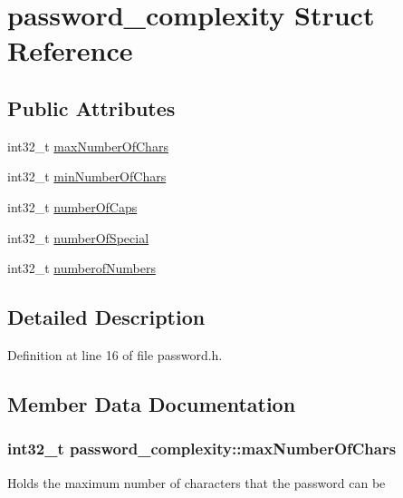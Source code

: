 \hypertarget{structpassword__complexity}{}\section{password\+\_\+complexity Struct Reference}
\label{structpassword__complexity}
\subsection*{Public Attributes}
\begin{DoxyCompactItemize}
\item 
int32\+\_\+t \hyperlink{structpassword__complexity_a09134d044a4dfcaa23169d40e90498ad}{max\+Number\+Of\+Chars}
\item 
int32\+\_\+t \hyperlink{structpassword__complexity_a4e524a569e1a1e942294bb6bc12c6d0f}{min\+Number\+Of\+Chars}
\item 
int32\+\_\+t \hyperlink{structpassword__complexity_ab69a60a334bd3dcdd8967bc02b293cd8}{number\+Of\+Caps}
\item 
int32\+\_\+t \hyperlink{structpassword__complexity_afd0de21e4cb24b9cb21136ca295ae821}{number\+Of\+Special}
\item 
int32\+\_\+t \hyperlink{structpassword__complexity_a459b8a5ef8ed7c14e3ce5bb12eefd5a5}{numberof\+Numbers}
\end{DoxyCompactItemize}


\subsection{Detailed Description}


Definition at line 16 of file password.\+h.



\subsection{Member Data Documentation}
\hypertarget{structpassword__complexity_a09134d044a4dfcaa23169d40e90498ad}{}
\subsubsection[{max\+Number\+Of\+Chars}]{\setlength{\rightskip}{0pt plus 5cm}int32\+\_\+t password\+\_\+complexity\+::max\+Number\+Of\+Chars}\label{structpassword__complexity_a09134d044a4dfcaa23169d40e90498ad}
Holds the maximum number of characters that the password can be 

